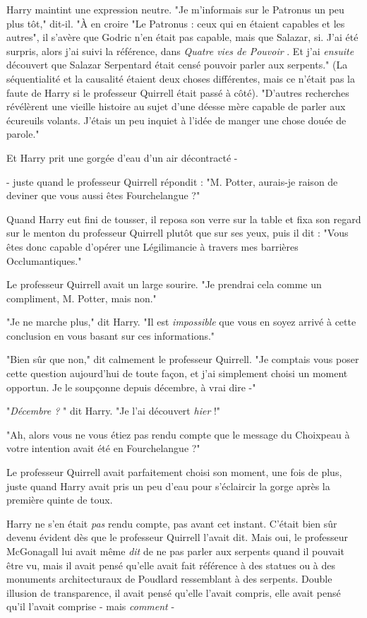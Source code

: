 Harry maintint une expression neutre. "Je m'informais sur le Patronus un peu plus tôt," dit-il. "À en croire "Le Patronus : ceux qui en étaient capables et les autres", il s'avère que Godric n'en était pas capable, mais que Salazar, si. J'ai été surpris, alors j'ai suivi la référence, dans \emph{Quatre vies de Pouvoir} . Et j'ai \emph{ensuite}  découvert que Salazar Serpentard était censé pouvoir parler aux serpents." (La séquentialité et la causalité étaient deux choses différentes, mais ce n'était pas la faute de Harry si le professeur Quirrell était passé à côté). "D'autres recherches révélèrent une vieille histoire au sujet d'une déesse mère capable de parler aux écureuils volants. J'étais un peu inquiet à l'idée de manger une chose douée de parole."

Et Harry prit une gorgée d'eau d'un air décontracté -

- juste quand le professeur Quirrell répondit : "M. Potter, aurais-je raison de deviner que vous aussi êtes Fourchelangue ?"

Quand Harry eut fini de tousser, il reposa son verre sur la table et fixa son regard sur le menton du professeur Quirrell plutôt que sur ses yeux, puis il dit : "Vous êtes donc capable d'opérer une Légilimancie à travers mes barrières Occlumantiques."

Le professeur Quirrell avait un large sourire. "Je prendrai cela comme un compliment, M. Potter, mais non."

"Je ne marche plus," dit Harry. "Il est \emph{impossible}  que vous en soyez arrivé à cette conclusion en vous basant sur ces informations."

"Bien sûr que non," dit calmement le professeur Quirrell. "Je comptais vous poser cette question aujourd'hui de toute façon, et j'ai simplement choisi un moment opportun. Je le soupçonne depuis décembre, à vrai dire -"

"\emph{Décembre ?} " dit Harry. "Je l'ai découvert \emph{hier}  !"

"Ah, alors vous ne vous étiez pas rendu compte que le message du Choixpeau à votre intention avait été en Fourchelangue ?"

Le professeur Quirrell avait parfaitement choisi son moment, une fois de plus, juste quand Harry avait pris un peu d'eau pour s'éclaircir la gorge après la première quinte de toux.

Harry ne s'en était \emph{pas}  rendu compte, pas avant cet instant. C'était bien sûr devenu évident dès que le professeur Quirrell l'avait dit. Mais oui, le professeur McGonagall lui avait même \emph{dit}  de ne pas parler aux serpents quand il pouvait être vu, mais il avait pensé qu'elle avait fait référence à des statues ou à des monuments architecturaux de Poudlard ressemblant à des serpents. Double illusion de transparence, il avait pensé qu'elle l'avait compris, elle avait pensé qu'il l'avait comprise - mais \emph{comment}  -

